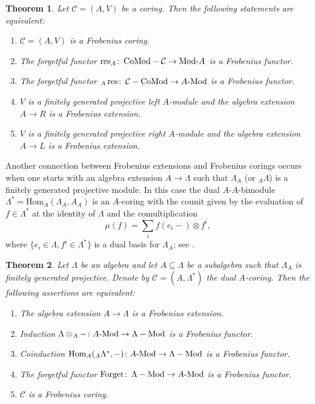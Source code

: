 \documentclass[12pt,a4paper]{amsart}
\theoremstyle{plain}
\newtheorem{thm}{Theorem}[section]
\theoremstyle{definition}
\numberwithin{equation}{thm}
\DeclareMathOperator{\LaMod}{\Lambda-Mod}
\DeclareMathOperator{\CCoMod}{\mathcal{C}-CoMod}
\DeclareMathOperator{\CoModC}{CoMod-\mathcal{C}}
\DeclareMathOperator{\res}{res}
\DeclareMathOperator{\Forget}{Forget}
\newcommand{\Mod}[1]{#1\hbox{-}\mathrm{Mod}}
\begin{document}
\begin{thm}\label{frobchar}
  Let $\mathcal{C}=(A,V)$ be a coring. Then the following statements are equivalent:
\begin{enumerate}
\renewcommand{\theenumi}{\Alph{enumi}}
  \item\label{frobchar:1} $\mathcal{C}=(A,V)$ is a Frobenius coring.
\item\label{frobchar:2} The forgetful functor $\res_A\colon \CoModC \rightarrow \mathrm{Mod}\hbox{-}A$ is a
  Frobenius functor. 
\item\label{frobchar:3} The forgetful functor ${}_A\res\colon \CCoMod \rightarrow \Mod{A}$ is a
  Frobenius functor.
\item\label{frobchar:4} $V$ is a finitely generated projective left $A$-module and the algebra 
  extension $A \rightarrow R$ is a Frobenius extension.
\item\label{frobchar:5} $V$ is a finitely generated projective right $A$-module and the algebra 
  extension $A \rightarrow L$ is a Frobenius extension.  
\end{enumerate}
\end{thm}

Another connection between Frobenius extensions and Frobenius corings occurs when one starts with 
an algebra extension $A\to \Lambda$ such that
     $\Lambda_A$ (or ${}_A\Lambda$) is a finitely generated projective module. In this case the dual $A$-$A$-bimodule $\Lambda^* = \mathrm{Hom}_A(\Lambda_A,A_A)$ is an  $A$-coring with the counit given by the evaluation of  $f\in \Lambda^*$ at the identity of $\Lambda$ and the comultiplication
\[
\mu(f) = \sum_i f(e_i-)\otimes f^i,
\]
where $\{e_i\in \Lambda, f^i\in \Lambda^*\}$ is a dual basis for $\Lambda_A$; see \cite[17.11]{BW03}.  

\begin{thm} \label{mainthm2}
Let $\Lambda$ be an algebra and let $A\subseteq \Lambda$ be a subalgebra such that $\Lambda_A$ is finitely generated projective. Denote by $\mathcal{C}=(A, \Lambda^* )$ the dual $A$-coring. Then the following assertions are equivalent:
\begin{enumerate}
\renewcommand{\theenumi}{\alph{enumi}}
\item\label{frobequ:1} The algebra extension $A\to \Lambda$ is a Frobenius extension. 
\item\label{frobequ:2} Induction $\Lambda\otimes_A -\colon \Mod{A}\to \LaMod$ is a Frobenius functor. 
\item\label{frobequ:3} Coinduction $\mathrm{Hom}_A({}_A\Lambda^*,-)\colon \Mod{A}\to \LaMod$ is a Frobenius functor.
\item\label{frobequ:4} The forgetful functor $\Forget\colon \LaMod\to\Mod{A}$ is a Frobenius functor.
\item\label{frobequ:5} $\mathcal{C}$ is a Frobenius coring.
\end{enumerate}
\end{thm}
\end{document}
